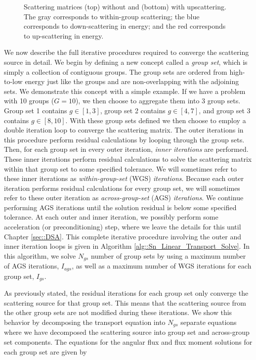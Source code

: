 \begin{figure}
\begin{subfigure}[b]{0.58\textwidth}
	\end{subfigure}
\caption[Scattering matrices with and without upscattering]{Scattering matrices (top) without and (bottom) with upscattering. The gray corresponds to within-group scattering; the blue corresponds to down-scattering in energy; and the red corresponds to up-scattering in energy.}
\label{fig::Sn_Solution_Iterative_scattmatrix}
\end{figure}

We now describe the full iterative procedures required to converge the scattering source in detail. We begin by defining a new concept called a {\em group set}, which is simply a collection of contiguous groups. The group sets are ordered from high-to-low energy just like the groups and are non-overlapping with the adjoining sets. We demonstrate this concept with a simple example. If we have a problem with 10 groups ($G=10$), we then choose to aggregate them into 3 group sets. Group set 1 contains $g \in [1,3]$, group set 2 contains $g \in [4,7]$, and group set 3 contains $g \in [8,10]$. With these group sets defined we then choose to employ a double iteration loop to converge the scattering matrix. The outer iterations in this procedure perform residual calculations by looping through the group sets. Then, for each group set in every outer iteration, {\em inner iterations} are performed. These inner iterations perform residual calculations to solve the scattering matrix within that group set to some specified tolerance. We will sometimes refer to these inner iterations as {\em within-group-set} (WGS) {\em iterations}. Because each outer iteration performs residual calculations for every group set, we will sometimes refer to these outer iteration as {\em across-group-set} (AGS) {\em iterations}. We continue performing AGS iterations until the solution residual is below some specified tolerance. At each outer and inner iteration, we possibly perform some acceleration (or preconditioning) step, where we leave the details for this until Chapter \ref{sec::DSA}. This complete iterative procedure involving the outer and inner iteration loops is given in Algorithm \ref{alg::Sn_Linear_Transport_Solve}. In this algorithm, we solve $N_{gs}$ number of group sets by using a maximum number of AGS iterations, $I_{ags}$, as well as a maximum number of WGS iterations for each group set, $I_{gs}$.

As previously stated, the residual iterations for each group set only converge the scattering source for that group set. This means that the scattering source from the other group sets are not modified during these iterations. We show this behavior by decomposing the transport equation into $N_{gs}$ separate equations where we have decomposed the scattering source into group set and across-group set components. The equations for the angular flux and flux moment solutions for each group set are given by

